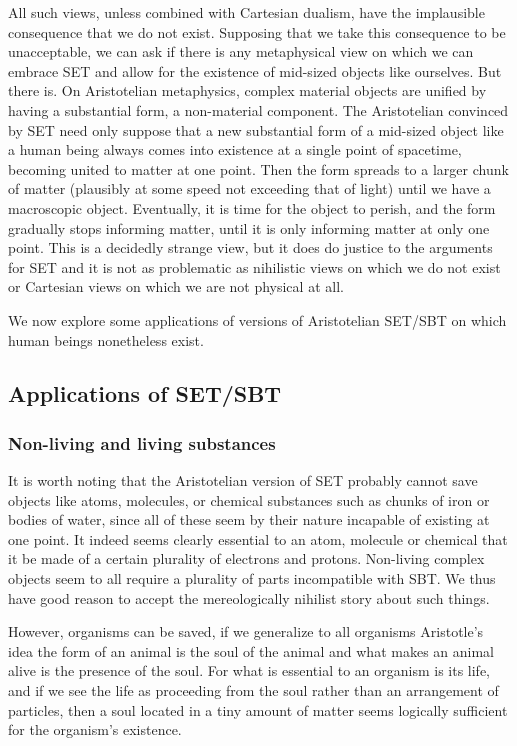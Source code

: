 All such views, unless combined with Cartesian dualism, have the implausible consequence that we do not exist. Supposing that we take this consequence to be unacceptable, we can ask if there is any metaphysical view on which we can embrace SET and allow for the existence of mid-sized objects like ourselves. But there is. On Aristotelian metaphysics, complex material objects are unified by having a substantial form, a non-material component. The Aristotelian convinced by SET need only suppose that a new substantial form of a mid-sized object like a human being always comes into existence at a single point of spacetime, becoming united to matter at one point. Then the form spreads to a larger chunk of matter (plausibly at some speed not exceeding that of light) until we have a macroscopic object. Eventually, it is time for the object to perish, and the form gradually stops informing matter, until it is only informing matter at only one point. This is a decidedly strange view, but it does do justice to the arguments for SET and it is not as problematic as nihilistic views on which we do not exist or Cartesian views on which we are not physical at all. 

We now explore some applications of versions of Aristotelian SET/SBT on which human beings nonetheless exist.

\subsection{Applications of SET/SBT}
\subsubsection{Non-living and living substances}
It is worth noting that the Aristotelian version of SET probably cannot save objects like atoms, molecules, 
or chemical substances such as chunks of iron or bodies of water, since all of these seem by their 
nature incapable of existing 
at one point. It indeed seems clearly essential
to an atom, molecule or chemical that it be made of a certain plurality of electrons and protons. Non-living
complex objects seem to all require a plurality of parts incompatible with SBT. We thus have good reason to
accept the mereologically nihilist story about such things.

However, organisms can be saved, if we generalize to all organisms Aristotle's idea the form of an animal 
is the soul of the animal and what makes an animal alive is the presence of the soul. For what is essential
to an organism is its life, and if we see the life as proceeding from the soul rather than an arrangement
of particles, then a soul located in a tiny amount of matter seems logically sufficient for the organism's
existence.

